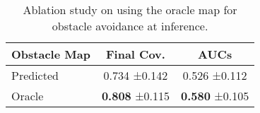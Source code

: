 \begin{wraptable}{r}{0.48\textwidth}  %
\caption{{Ablation study on using the oracle map for obstacle avoidance at inference.}}
\centering
\vspace{-0.5em}
\begin{tabular}{lcc}
\toprule
\textbf{Obstacle Map} & \textbf{Final Cov.} & \textbf{AUCs} \\
\midrule
Predicted & 0.734 \tiny{±0.142} & 0.526 \tiny{±0.112} \\
Oracle & \textbf{0.808} \tiny{±0.115} & \textbf{0.580} \tiny{±0.105} \\
\bottomrule
\end{tabular}%
\label{tab:ablation_gt}
\vspace{-1em}
\end{wraptable}